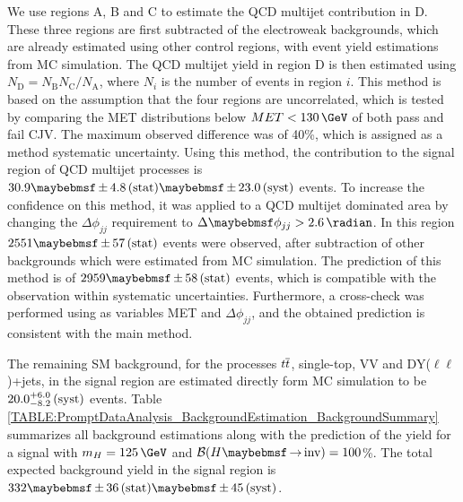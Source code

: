 We use regions A, B and C to estimate the \gls{QCD} multijet contribution in D. These three regions are first subtracted of the electroweak backgrounds, which are already estimated using other control regions, with event yield estimations from \gls{MC} simulation. The \gls{QCD} multijet yield in region D is then estimated using $N_\mathrm{D} = N_\mathrm{B}N_\mathrm{C} / N_\mathrm{A}$, where $N_{i}$ is the number of events in region $i$. This method is based on the assumption that the four regions are uncorrelated, which is tested by comparing the \gls{MET} distributions below $MET < 130\,\GeV$ of both pass and fail \gls{CJV}. The maximum observed difference was of 40\%, which is assigned as a method systematic uncertainty. Using this method, the contribution to the signal region of \gls{QCD} multijet processes is $30.9 \pm 4.8\stat \pm 23.0\syst$ events. To increase the confidence on this method, it was applied to a \gls{QCD} multijet dominated area by changing the $\Delta\phi_{jj}$ requirement to $\Delta\phi_{jj}>2.6\,\radian$. In this region $2551 \pm 57\stat$ events were observed, after subtraction of other backgrounds which were estimated from \gls{MC} simulation. The prediction of this method is of $2959 \pm 58\stat$ events, which is compatible with the observation within systematic uncertainties. Furthermore, a cross-check was performed using as variables \gls{MET} and $\Delta\phi_{jj}$, and the obtained prediction is consistent with the main method.

The remaining \gls{SM} background, for the processes $t\overline{t}$, single-top, VV and DY($\ell\ell$)+jets, in the signal region are estimated  directly form \gls{MC} simulation to be $20.0 ^{+6.0}_{-8.2}\,\text{(syst)}$ events. Table \ref{TABLE:PromptDataAnalysis_BackgroundEstimation_BackgroundSummary} summarizes all background estimations along with the prediction of the yield for a signal with $m_{H}=125\,\GeV$ and $\BRinv=100$\%. The total expected background yield in the signal region is $332 \pm 36\stat \pm 45\syst$. 


